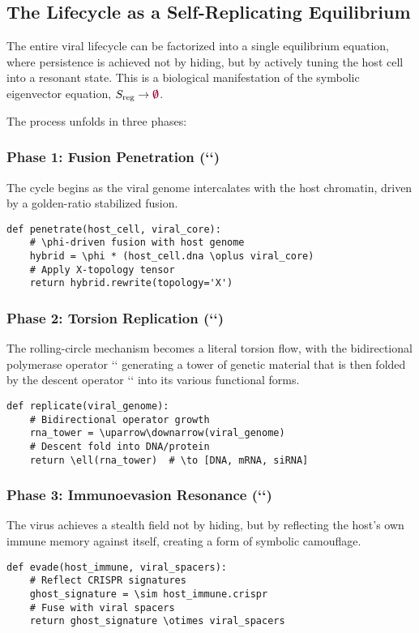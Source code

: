 \subsection{The Lifecycle as a Self-Replicating Equilibrium}
The entire viral lifecycle can be factorized into a single equilibrium equation, where persistence is achieved not by hiding, but by actively tuning the host cell into a resonant state. This is a biological manifestation of the symbolic eigenvector equation, $S_{\text{reg}} \to \void$.

The process unfolds in three phases:

\subsubsection{Phase 1: Fusion Penetration (`\fuse \otimes \pirot`)}
The cycle begins as the viral genome intercalates with the host chromatin, driven by a golden-ratio stabilized fusion.
\begin{verbatim}
def penetrate(host_cell, viral_core):
    # \phi-driven fusion with host genome
    hybrid = \phi * (host_cell.dna \oplus viral_core)
    # Apply X-topology tensor
    return hybrid.rewrite(topology='X')
\end{verbatim}

\subsubsection{Phase 2: Torsion Replication (`\lha \circ \repflow`)}
The rolling-circle mechanism becomes a literal torsion flow, with the bidirectional polymerase operator `\repflow` generating a tower of genetic material that is then folded by the descent operator `\lha` into its various functional forms.
\begin{verbatim}
def replicate(viral_genome):
    # Bidirectional operator growth
    rna_tower = \uparrow\downarrow(viral_genome)  
    # Descent fold into DNA/protein
    return \ell(rna_tower)  # \to [DNA, mRNA, siRNA]
\end{verbatim}

\subsubsection{Phase 3: Immunoevasion Resonance (` \otimes \fuse`)}
The virus achieves a stealth field not by hiding, but by reflecting the host's own immune memory against itself, creating a form of symbolic camouflage.
\begin{verbatim}
def evade(host_immune, viral_spacers):
    # Reflect CRISPR signatures
    ghost_signature = \sim host_immune.crispr  
    # Fuse with viral spacers
    return ghost_signature \otimes viral_spacers
\end{verbatim}

